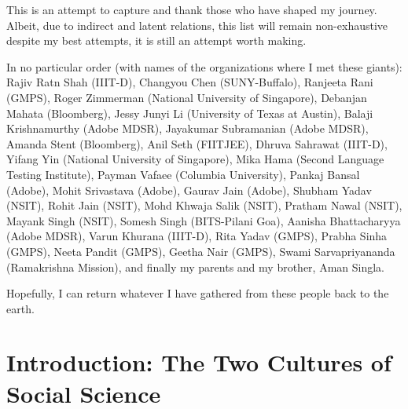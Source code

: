 \documentclass[hidelinks,11pt,a4paper]{report}
\begin{document}
This is an attempt to capture and thank those who have shaped my journey. Albeit, due to indirect and latent relations, this list will remain non-exhaustive despite my best attempts, it is still an attempt worth making.

In no particular order (with names of the organizations where I met these giants): Rajiv Ratn Shah (IIIT-D), Changyou Chen (SUNY-Buffalo), Ranjeeta Rani (GMPS), Roger Zimmerman (National University of Singapore), Debanjan Mahata (Bloomberg), Jessy Junyi Li (University of Texas at Austin), Balaji Krishnamurthy (Adobe MDSR), Jayakumar Subramanian (Adobe MDSR), Amanda Stent (Bloomberg), Anil Seth (FIITJEE), Dhruva Sahrawat (IIIT-D), Yifang Yin (National University of Singapore), Mika Hama (Second Language Testing Institute), Payman Vafaee (Columbia University), Pankaj Bansal (Adobe), Mohit Srivastava (Adobe), Gaurav Jain (Adobe), Shubham Yadav (NSIT), Rohit Jain (NSIT), Mohd Khwaja Salik (NSIT), Pratham Nawal (NSIT), Mayank Singh (NSIT), Somesh Singh (BITS-Pilani Goa), Aanisha Bhattacharyya (Adobe MDSR), Varun Khurana (IIIT-D), Rita Yadav (GMPS), Prabha Sinha (GMPS), Neeta Pandit (GMPS), Geetha Nair (GMPS), Swami Sarvapriyananda (Ramakrishna Mission), and finally my parents and my brother, Aman Singla.


Hopefully, I can return whatever I have gathered from these people back to the earth.
\clearpage



{\small\tableofcontents}




\chapter{Introduction: The Two Cultures of Social Science}
\setcounter{page}{1}

\end{document}
